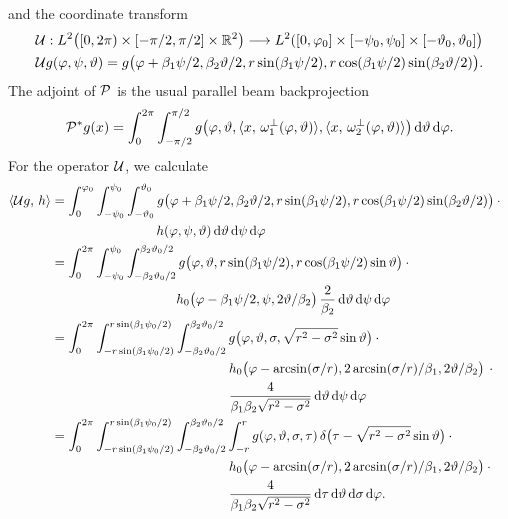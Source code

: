 \documentclass{amsart}
\renewcommand*{\phi}{\varphi}
\begin{document}
%
and the coordinate transform
%
\begin{align}
 &\OPU: L^2\big( [0, 2\pi) \times [-\pi/2, \pi/2] \times \RR^2 \big) \Lto L^2([0, \phi_0] \times [-\psi_0, \psi_0] \times 
 [-\vartheta_0, \vartheta_0] \big) \notag \\
 \label{eq:conecurved:coord_op}
 &\OPU g(\phi, \psi, \vartheta) = g\big( \phi + \beta_1\psi/2, \beta_2\vartheta/2, r\sin(\beta_1\psi/2), r \cos(\beta_1\psi/2) 
 \sin(\beta_2\vartheta/2) \big).
\end{align}
%
The adjoint of ${\mathcal{P}}$ is the usual parallel beam backprojection
%
\begin{equation}
 \label{eq:conecurved:xray_backproj}
 \DUALOPP g(x) = \int_0^{2\pi} \int_{-\pi/2}^{\pi/2} g\big( \phi, \vartheta, \INNER{x}{\omega_1^\perp(\phi, \vartheta)}, 
 \INNER{x}{\omega_2^\perp(\phi, \vartheta)} \big)\, \D\vartheta\, \D\phi.
\end{equation} 
%
For the operator ${\mathcal{U}}$, we calculate
%
\begin{align*}
 \INNER{\OPU g}{h}
 &= \int_0^{\phi_0} \int_{-\psi_0}^{\psi_0} \int_{-\vartheta_0}^{\vartheta_0} g\big( \phi + \beta_1\psi/2, \beta_2\vartheta/2, 
 r\sin(\beta_1\psi/2), r \cos(\beta_1\psi/2) \sin(\beta_2\vartheta/2) \big) \cdot \phantom{x} \\
 &\hspace{80pt} h(\phi, \psi, \vartheta)\, \D\vartheta\, \D\psi\, \D\phi \\
 &= \int_0^{2\pi} \int_{-\psi_0}^{\psi_0} \int_{-\beta_2\vartheta_0/2}^{\beta_2\vartheta_0/2} g\big( \phi, \vartheta, 
 r\sin(\beta_1\psi/2), r \cos(\beta_1\psi/2) \sin\vartheta \big) \cdot \phantom{x} \\
 &\hspace{95pt} h_0\big( \phi - \beta_1\psi/2, \psi, 2\vartheta/\beta_2 \big)\, 
 \frac{2}{\beta_2}\, \D\vartheta\, \D\psi\, \D\phi \\
 &= \int_0^{2\pi} \int_{-r\sin(\beta_1\psi_0/2)}^{r\sin(\beta_1\psi_0/2)} \int_{-\beta_2\vartheta_0/2}^{\beta_2\vartheta_0/2}
 g\big( \phi, \vartheta, \sigma, \sqrt{r^2 - \sigma^2} \sin\vartheta \big) \cdot \phantom{x} \\
 &\hspace{135pt} h_0\big( \phi - \arcsin(\sigma/r), 2\arcsin(\sigma/r)/\beta_1, 2\vartheta/\beta_2 \big)\, \cdot \phantom{x} \\
 &\hspace{135pt} \frac{4}{\beta_1\beta_2\sqrt{r^2 - \sigma^2}}\, \D\vartheta\, \D\psi\, \D\phi \\
 &= \int_0^{2\pi} \int_{-r\sin(\beta_1\psi_0/2)}^{r\sin(\beta_1\psi_0/2)} \int_{-\beta_2\vartheta_0/2}^{\beta_2\vartheta_0/2} \int_{-r}^r
 g(\phi, \vartheta, \sigma, \tau)\, \delta\big(\tau - \sqrt{r^2 - \sigma^2} \sin\vartheta \big) \cdot \phantom{x} \\
 &\hspace{135pt} h_0\big( \phi - \arcsin(\sigma/r), 2\arcsin(\sigma/r)/\beta_1, 2\vartheta/\beta_2 \big) \cdot \phantom{x} \\
 &\hspace{135pt} \frac{4}{\beta_1\beta_2\sqrt{r^2 - \sigma^2}}\, \D\tau\, \D\vartheta\, \D\sigma\, \D\phi.
\end{align*}
\end{document}
